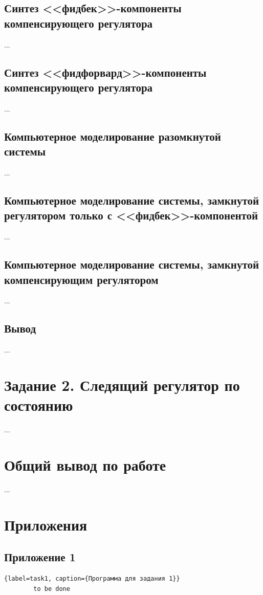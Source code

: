 \documentclass[a4paper, 12pt]{article}
\begin{document}
    \subsection{Синтез <<фидбек>>-компоненты компенсирующего регулятора}
    ...


    \subsection{Синтез <<фидфорвард>>-компоненты компенсирующего регулятора}
    ...


    \subsection{Компьютерное моделирование разомкнутой системы}
    ...


    \subsection{Компьютерное моделирование системы, замкнутой регулятором только с <<фидбек>>-компонентой}
    ...


    \subsection{Компьютерное моделирование системы, замкнутой компенсирующим регулятором}
    ...


    \subsection{Вывод}
    ...


    \section{Задание 2. Следящий регулятор по состоянию}
    ...


    \section{Общий вывод по работе}
    ...


    \section{Приложения}
    \subsection{Приложение 1}
    \begin{lstlisting}{label=task1, caption={Программа для задания 1}}
        to be done
    \end{lstlisting}
\end{document}
